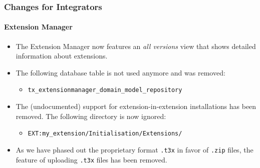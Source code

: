 %

\begin{frame}[fragile]
	\frametitle{Changes for Integrators}
	\framesubtitle{Extension Manager}

	\begin{itemize}

		\item The Extension Manager now features an \textit{all versions} view
			that shows detailed information about extensions.

		\item The following database table is not used anymore and was removed:
			\begin{itemize}\small
				\item \texttt{tx\_extensionmanager\_domain\_model\_repository}
			\end{itemize}\normalsize
			\vspace{0.2cm}

		\item The (undocumented) support for extension-in-extension installations
			has been removed. The following directory is now ignored:
			\begin{itemize}\small
				\item \texttt{EXT:my\_extension/Initialisation/Extensions/}
			\end{itemize}
			\vspace{0.2cm}

		\item As we have phased out the proprietary format \texttt{.t3x} in favor
			of \texttt{.zip} files, the feature of uploading \texttt{.t3x} files
			has been removed.

	\end{itemize}

\end{frame}

